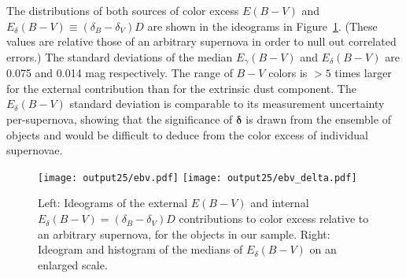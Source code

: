 \documentclass{aastex61}   	%
\begin{document}
The distributions of both sources of color excess $E(B-V)$ and
 $E_\delta(B-V) \equiv   (\delta_B-\delta_V)D$ are shown in the ideograms in Figure~\ref{ebv:fig}.
 (These values are relative those of an arbitrary supernova in order to null out correlated errors.)
The standard deviations of  the median $E_\gamma(B-V)$ and $E_\delta(B-V)$ are
0.075
and 0.014
mag respectively.
The range of $B-V$ colors is $> 5$ times larger for the external contribution than for the extrinsic dust
component.   The $E_\delta(B-V)$ standard deviation is comparable to its measurement uncertainty per-supernova, showing that
the significance of $\pmb{\delta}$
is drawn from the ensemble of objects and
would be difficult to deduce from the color excess of individual supernovae.

\begin{figure}[htbp] %
   \centering
   \texttt{[image: output25/ebv.pdf]}
   \texttt{[image: output25/ebv\_delta.pdf]}
      \caption{Left: Ideograms of the external $E(B-V)$ and
   internal $E_\delta(B-V) = (\delta_B-\delta_V)D$  contributions to color excess relative to an arbitrary supernova, for the objects in our sample.
   Right: Ideogram and histogram of the medians of $E_\delta(B-V)$ on an enlarged scale.
   \label{ebv:fig}}
\end{figure}
\end{document}

